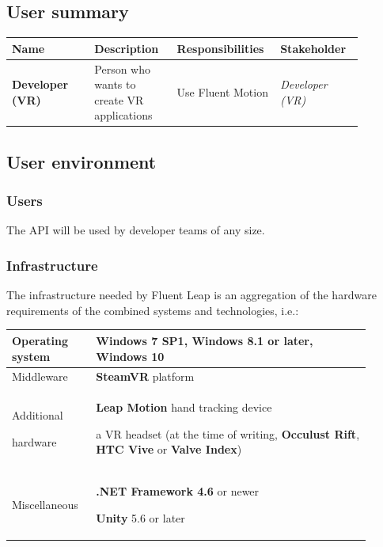 \documentclass[12pt,a4paper,twoside]{report}
\begin{document}
\subsection{User summary}

\begin{table}[h]
  \centering
  \begin{tabular}{| m{0.22\linewidth} | m{0.22\linewidth} | m{0.22\linewidth} | m{0.22\linewidth} |}
    \hline
    \rowcolor{lightgray} Name & Description & Responsibilities & Stakeholder \\
    \hline
    \textbf{Developer (VR)} & Person who wants to create VR applications & Use Fluent Motion & \textit{Developer (VR)} \\
    \hline
  \end{tabular}
\end{table}

\subsection{User environment}

\subsubsection{Users}
The API will be used by developer teams of any size.

\subsubsection{Infrastructure}
The infrastructure needed by Fluent Leap is an aggregation of the hardware requirements of the combined systems and technologies, i.e.:

\begin{table}[h]
  \centering
  \begin{tabular}{| m{0.2\linewidth} | m{0.7\linewidth} |}
    \hline
    Operating system & \textbf{Windows 7 SP1}, \textbf{Windows 8.1} or later, \textbf{Windows 10} \\
    \hline
    Middleware & \textbf{SteamVR} platform \\
    \hline
    Additional 
    
    hardware & \textbf{Leap Motion} hand tracking device

    a VR headset (at the time of writing, \textbf{Occulust Rift}, \textbf{HTC Vive} or \textbf{Valve Index}) \\
    \hline
    Miscellaneous & \textbf{.NET Framework 4.6} or newer

    \textbf{Unity} 5.6 or later \\
    \hline
  \end{tabular}
\end{table}
\end{document}
